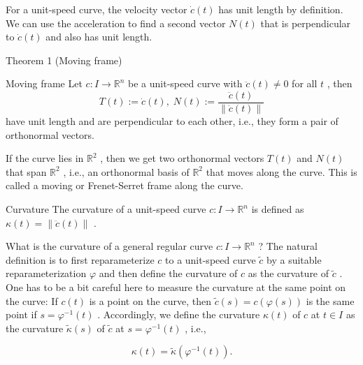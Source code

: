 For a unit-speed curve, the velocity vector \(\dot{c}\left( t\right)\) has unit length by definition. We can use the acceleration to find a second vector \(N\left( t\right)\) that is perpendicular to \(\dot{c}\left( t\right)\) and also has unit length.



Theorem 1 (Moving frame)

\begin{theorem}{Moving frame}
    Let \(c : I \rightarrow  {\mathbb{R}}^{n}\) be a unit-speed curve with \(\ddot{c}\left( t\right)  \neq  0\) for all \(t\) , then
    \[
    T\left( t\right)  \mathrel{\text{ := }} \dot{c}\left( t\right) ,\;N\left( t\right)  \mathrel{\text{ := }} \frac{\ddot{c}\left( t\right) }{\parallel \ddot{c}\left( t\right) \parallel } \tag{1.2}
    \]
    have unit length and are perpendicular to each other, i.e., they form a pair of orthonormal vectors.
\end{theorem}

If the curve lies in \({\mathbb{R}}^{2}\) , then we get two orthonormal vectors \(T\left( t\right)\) and \(N\left( t\right)\) that span \({\mathbb{R}}^{2}\) , i.e., an orthonormal basis of \({\mathbb{R}}^{2}\) that moves along the curve. This is called a moving or Frenet-Serret frame along the curve.


\begin{definition}{Curvature}
    The curvature of a unit-speed curve \(c : I \rightarrow  {\mathbb{R}}^{n}\) is defined as \(\kappa \left( t\right)  = \parallel \ddot{c}\left( t\right) \parallel\) .
\end{definition}


What is the curvature of a general regular curve \(c : I \rightarrow  {\mathbb{R}}^{n}\) ? The natural definition is to first reparameterize \(c\) to a unit-speed curve \(\widetilde{c}\) by a suitable reparameterization \(\varphi\) and then define the curvature of \(c\) as the curvature of \(\widetilde{c}\) . One has to be a bit careful here to measure the curvature at the same point on the curve: If \(c\left( t\right)\) is a point on the curve, then \(\widetilde{c}\left( s\right)  = c\left( {\varphi \left( s\right) }\right)\) is the same point if \(s = {\varphi }^{-1}\left( t\right)\) . Accordingly, we define the curvature \(\kappa \left( t\right)\) of \(c\) at \(t \in  I\) as the curvature \(\widetilde{\kappa }\left( s\right)\) of \(\widetilde{c}\) at \(s = {\varphi }^{-1}\left( t\right)\) , i.e.,

\[
\kappa \left( t\right)  = \widetilde{\kappa }\left( {{\varphi }^{-1}\left( t\right) }\right) . \tag{1.3}
\]


